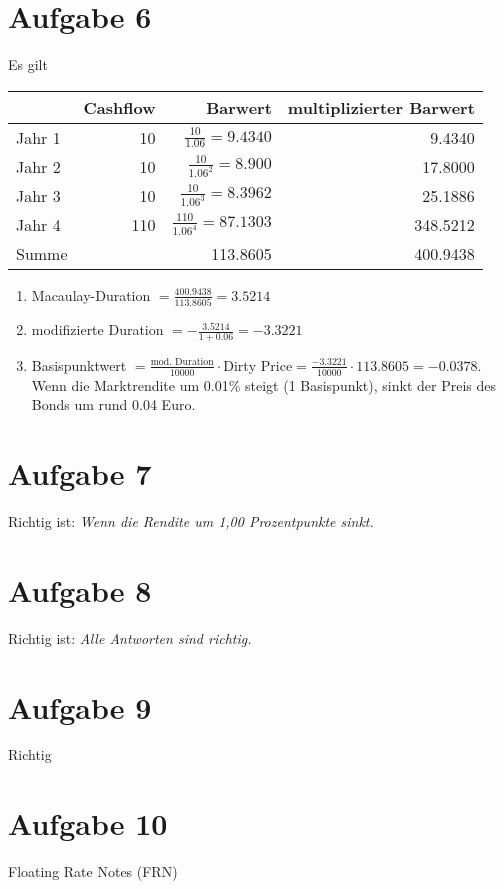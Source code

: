 \documentclass{article}
\begin{document}
	\section*{Aufgabe 6}
	Es gilt
	\begin{center}
		\begin{tabular}{l|r|r|r}
			& \textbf{Cashflow} & \textbf{Barwert} & \textbf{multiplizierter Barwert} \\
			\hline
			Jahr 1 & 10 & $\frac{10}{1.06}=9.4340$ & 9.4340 \\
			Jahr 2 & 10 & $\frac{10}{1.06^2}=8.900$ & 17.8000 \\
			Jahr 3 & 10 & $\frac{10}{1.06^3}=8.3962$ & 25.1886 \\
			Jahr 4 & 110 & $\frac{110}{1.06^4}=87.1303$ & 348.5212 \\
			\hline
			Summe & & 113.8605 & 400.9438
		\end{tabular}
	\end{center}
	\begin{enumerate}[label=(\alph*)]
		\item Macaulay-Duration $= \frac{400.9438}{113.8605}=3.5214$
		\item modifizierte Duration $= - \frac{3.5214}{1+0.06} = -3.3221$
		\item Basispunktwert $= \frac{\text{mod. Duration}}{10000}\cdot\text{Dirty Price} = \frac{-3.3221}{10000}\cdot 113.8605 = -0.0378$. Wenn die Marktrendite um 0.01\% steigt (1 Basispunkt), sinkt der Preis des Bonds um rund 0.04 Euro.
	\end{enumerate}
	
	\section*{Aufgabe 7}
	Richtig ist: \textit{Wenn die Rendite um 1,00 Prozentpunkte sinkt.}
	
	\section*{Aufgabe 8}
	Richtig ist: \textit{Alle Antworten sind richtig.}
	
	\section*{Aufgabe 9}
	Richtig
	
	\section*{Aufgabe 10}
	Floating Rate Notes (FRN)
	
\end{document}
